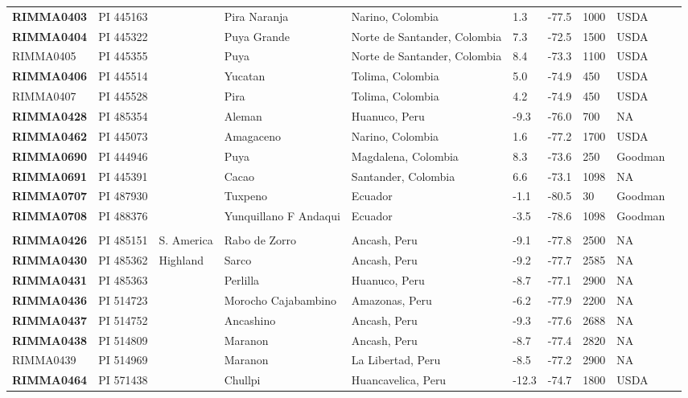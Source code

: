 \begin{table}[h]
\begin{center}
{\begin{tabular}{llllllllll}
{\bf RIMMA0403}	&	PI 445163	&		&	Pira Naranja	&	Narino, Colombia	&	1.3 	&	-77.5 	&	1000	&	USDA	\\
{\bf RIMMA0404}	&	PI 445322	&		&	Puya Grande	&	Norte de Santander, Colombia	&	7.3 	&	-72.5 	&	1500	&	USDA	\\
RIMMA0405	&	PI 445355	&		&	Puya	&	Norte de Santander, Colombia	&	8.4 	&	-73.3 	&	1100	&	USDA	\\
{\bf RIMMA0406}	&	PI 445514	&		&	Yucatan	&	Tolima, Colombia	&	5.0 	&	-74.9 	&	450	&	USDA	\\
RIMMA0407	&	PI 445528	&		&	Pira	&	Tolima, Colombia	&	4.2 	&	-74.9 	&	450	&	USDA	\\
{\bf RIMMA0428}	&	PI 485354	&		&	Aleman	&	Huanuco, Peru	&	-9.3 	&	-76.0 	&	700	&	NA	\\
{\bf RIMMA0462}	&	PI 445073	&		&	Amagaceno	&	Narino, Colombia	&	1.6 	&	-77.2 	&	1700	&	USDA	\\
{\bf RIMMA0690}	&	PI 444946	&		&	Puya	&	Magdalena, Colombia	&	8.3 	&	-73.6 	&	250	&	Goodman	\\
{\bf RIMMA0691}	&	PI 445391	&		&	Cacao	&	Santander, Colombia	&	6.6 	&	-73.1 	&	1098	&	NA	\\
{\bf RIMMA0707}	&	PI 487930	&		&	Tuxpeno	&	Ecuador	&	-1.1 	&	-80.5 	&	30	&	Goodman	\\
{\bf RIMMA0708}	&	PI 488376	&		&	Yunquillano F Andaqui	&	Ecuador	&	-3.5 	&	-78.6 	&	1098	&	Goodman	\\
	\hline 
	& & & \\[-4mm] 
{\bf RIMMA0426}	&	PI 485151	&	S. America	&	Rabo de Zorro	&	Ancash, Peru	&	-9.1 	&	-77.8 	&	2500	&	NA	\\
{\bf RIMMA0430}	&	PI 485362	&	Highland	&	Sarco	&	Ancash, Peru	&	-9.2 	&	-77.7 	&	2585	&	NA	\\
{\bf RIMMA0431}	&	PI 485363	&	 	&	Perlilla	&	Huanuco, Peru	&	-8.7 	&	-77.1 	&	2900	&	NA	\\
{\bf RIMMA0436}	&	PI 514723	&		&	Morocho Cajabambino	&	Amazonas, Peru	&	-6.2 	&	-77.9 	&	2200	&	NA	\\
{\bf RIMMA0437}	&	PI 514752	&		&	Ancashino	&	Ancash, Peru	&	-9.3 	&	-77.6 	&	2688	&	NA	\\
{\bf RIMMA0438}	&	PI 514809	&		&	Maranon	&	Ancash, Peru	&	-8.7 	&	-77.4 	&	2820	&	NA	\\
RIMMA0439	&	PI 514969	&		&	Maranon	&	La Libertad, Peru	&	-8.5 	&	-77.2 	&	2900	&	NA	\\
{\bf RIMMA0464}	&	PI 571438	&		&	Chullpi	&	Huancavelica, Peru	&	-12.3 	&	-74.7 	&	1800	&	USDA	\\

\end{tabular}}
\end{center}
\end{table}

